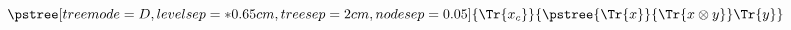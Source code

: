 $\displaystyle
\pstree[treemode=\CItreemode,levelsep=*0.65cm,treesep=\CItreesep,nodesep=0.05]
{
	\Tr{x_c}
}
{
   \pstree
	{
	   \Tr{x}
	}
	{
		\Tr{x \cross y} 
	}
	\Tr{y}
}
$